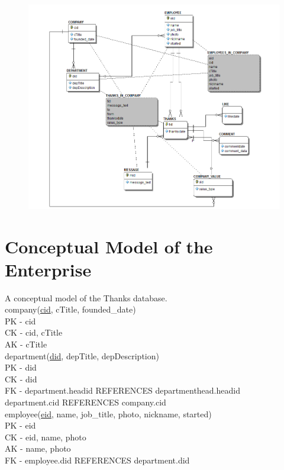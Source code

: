 \documentclass[11pt]{report}
\begin{document}
\begin{figure}[!htb]
\centering
\includegraphics[scale=.7]{./images/erd12-5.PNG}
\end{figure}
\clearpage

\section{Conceptual Model of the Enterprise}
A conceptual model of the Thanks database. \\

company(\underline{cid}, cTitle, founded\_date) \\
PK - cid \\
CK - cid, cTitle \\
AK - cTitle \\

department(\underline{did}, depTitle, depDescription) \\
PK - did \\
CK - did \\
FK - department.headid REFERENCES departmenthead.headid \\
     department.cid REFERENCES company.cid \\

employee(\underline{eid}, name, job\_title, photo, nickname, started) \\
PK - eid \\
CK - eid, name, photo \\
AK - name, photo \\
FK - employee.did REFERENCES department.did \\
\end{document}
